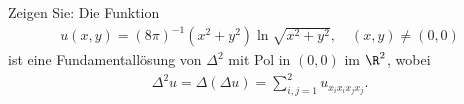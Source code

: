 
\begin{exercise}

Zeigen Sie: Die Funktion
\begin{align*}
  u(x,y) = (8\pi)^{-1}(x^2 + y^2)\ln\sqrt{x^2+y^2}, \quad (x,y) \neq (0,0)
\end{align*}
ist eine Fundamentallösung von $\Delta^2$ mit Pol in $(0,0)$ im $\R^2$, wobei
\begin{align*}
  \Delta^2u = \Delta(\Delta u) = \sum_{i,j = 1}^2 u_{x_ix_ix_jx_j}.
\end{align*}

\end{exercise}


\begin{solution}

\phantom{}

\end{solution}

